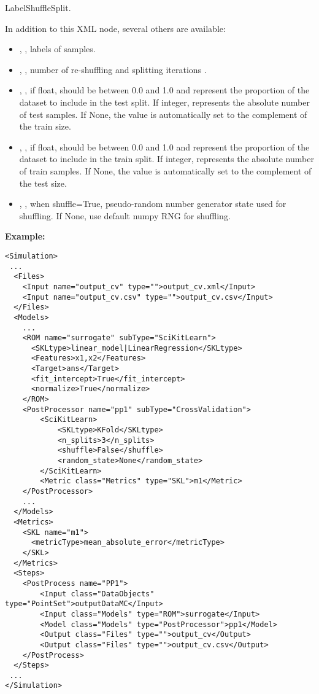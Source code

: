LabelShuffleSplit.

In addition to this XML node, several others are available:
\begin{itemize}
  \item {}, , labels of samples.
  \item {}, , number of re-shuffling and splitting iterations
    .
  \item {}, , if float, should be between 0.0 and 1.0 and
    represent the proportion of the dataset to include in the test split. 
    If integer, represents the absolute number of test samples. If None, the value is automatically set to
    the complement of the train size.
  \item {}, , if float, should be between 0.0 and 1.0 and represent
    the proportion of the dataset to include in the train split. If integer, represents the absolute number of train
    samples. If None, the value is automatically set to the complement of the test size. 
  \item {}, , when shuffle=True,
    pseudo-random number generator state used for shuffling. If None, use default numpy RNG for shuffling.
\end{itemize}

\textbf{Example:}

\begin{lstlisting}[style=XML]
<Simulation>
 ...
  <Files>
    <Input name="output_cv" type="">output_cv.xml</Input>
    <Input name="output_cv.csv" type="">output_cv.csv</Input>
  </Files>
  <Models>
    ...
    <ROM name="surrogate" subType="SciKitLearn">
      <SKLtype>linear_model|LinearRegression</SKLtype>
      <Features>x1,x2</Features>
      <Target>ans</Target>
      <fit_intercept>True</fit_intercept>
      <normalize>True</normalize>
    </ROM>
    <PostProcessor name="pp1" subType="CrossValidation">
        <SciKitLearn>
            <SKLtype>KFold</SKLtype>
            <n_splits>3</n_splits>
            <shuffle>False</shuffle>
            <random_state>None</random_state>
        </SciKitLearn>
        <Metric class="Metrics" type="SKL">m1</Metric>
    </PostProcessor>
    ...
  </Models>
  <Metrics>
    <SKL name="m1">
      <metricType>mean_absolute_error</metricType>
    </SKL>
  </Metrics>
  <Steps>
    <PostProcess name="PP1">
        <Input class="DataObjects" type="PointSet">outputDataMC</Input>
        <Input class="Models" type="ROM">surrogate</Input>
        <Model class="Models" type="PostProcessor">pp1</Model>
        <Output class="Files" type="">output_cv</Output>
        <Output class="Files" type="">output_cv.csv</Output>
    </PostProcess>
  </Steps>
 ...
</Simulation>
\end{lstlisting}

